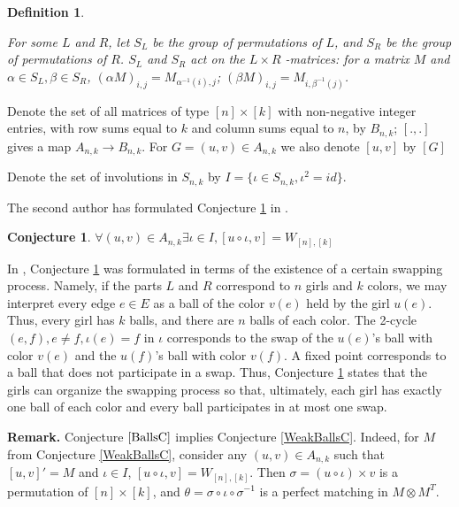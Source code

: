 \documentclass[12pt]{article}
\newtheorem{conjecture}{Conjecture}
\theoremstyle{definition}
\theoremstyle{plain}
\newtheorem{definition}{Definition}[section]
\begin{document}
\begin{definition} \label {ActionB}

For some $L$ and $R$, let $S_L$ be the group of permutations of $L$, and $S_R$ be the group of permutations of $R$. $S_L$ and $S_R$ act on the $L \times R$ -matrices: for a matrix $M$ and $\alpha \in S_L, \beta \in S_R$, $(\alpha M)_{i,j} = M_{\alpha^{-1}(i),j}$; $(\beta M)_{i,j} = M_{i, \beta^{-1}(j)}$. 

\end{definition}

Denote the set of all matrices of type $[n] \times [k]$ with non-negative integer entries, with row sums equal to $k$ and column sums equal to $n$, by $B_{n,k}$;
$[.,.]$ gives a map $A_{n,k} \rightarrow B_{n,k}$. For $G = (u,v) \in A_{n,k}$ we also denote $[u,v]$ by $[G]$

Denote the set of involutions in $S_{n,k}$ by $I = \{ \iota \in S_{n,k}, \iota^2 = id \}$.

The second author has formulated Conjecture \ref{BallsC} in \cite{P}. 

\begin{conjecture}\label{BallsC}
  $\forall (u,v) \in A_{n,k} \exists \iota \in I, [u \circ \iota, v] = W_{[n],[k]}$
\end{conjecture}

In \cite{P}, Conjecture \ref{BallsC} was formulated in terms of the existence of a certain swapping process. Namely, if the parts $L$ and $R$ correspond to
$n$ girls and $k$ colors, we may interpret
every edge $e \in E$ as a ball of the color $v(e)$ held by the girl $u(e)$. Thus, every girl has $k$ balls, and there are $n$ balls of each color. 
The 2-cycle $(e,f), e \neq f, \iota(e)=f$ in $\iota$  corresponds to the swap of the $u(e)$'s ball with color $v(e)$ and the $u(f)$'s ball with color $v(f)$. A fixed point corresponds to a ball that does not participate in a swap.
Thus, Conjecture \ref{BallsC} states that the girls can organize the swapping process so that, ultimately, each girl has exactly one ball of each color and every ball participates in at most one swap.

\medskip
\noindent
\textbf{Remark.}
Conjecture $\ref{BallsC}$ implies Conjecture \ref{WeakBallsC}. Indeed, for $M$ from Conjecture \ref{WeakBallsC}, consider any $(u,v) \in A_{n,k}$ such that $[u,v]'=M$ and $\iota \in I$, $[u \circ \iota, v]=W_{[n],[k]}$. Then $\sigma = (u \circ \iota) \times v$ is a permutation of $[n]\times[k]$, and $\theta = \sigma \circ\iota \circ \sigma^{-1}$ is a perfect matching in $M \otimes M^T$.
\end{document}

